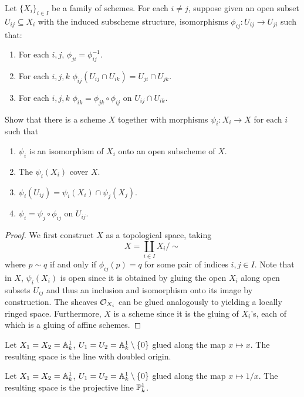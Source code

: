 \begin{proposition}\label{prop: gluing schemes}
    Let $\{X_{i}\}_{i\in I}$ be a family of schemes. For each $i\neq j$, suppose given an open subset $U_{ij}\subseteq X_{i}$ with the induced subscheme structure, isomorphisms $\phi_{ij}:U_{ij}\to U_{ji}$ such that:
    \begin{enumerate}[label=(\arabic*)]
        \item For each $i,j$, $\phi_{ji}=\phi_{ij}^{-1}$. 
        \item For each $i,j,k$ $\phi_{ij}(U_{ij}\cap U_{ik})=U_{ji}\cap U_{jk}$. 
        \item For each $i,j,k$ $\phi_{ik}=\phi_{jk}\circ\phi_{ij}$ on $U_{ij}\cap U_{ik}$. 
    \end{enumerate}
    Show that there is a scheme $X$ together with morphisms $\psi_{i}:X_{i}\to X$ for each $i$ such that 
    \begin{enumerate}[label=(\arabic*)]
        \item $\psi_{i}$ is an isomorphism of $X_{i}$ onto an open subscheme of $X$. 
        \item The $\psi_{i}(X_{i})$ cover $X$. 
        \item $\psi_{i}(U_{ij})=\psi_{i}(X_{i})\cap \psi_{j}(X_{j})$. 
        \item $\psi_{i}=\psi_{j}\circ\phi_{ij}$ on $U_{ij}$. 
    \end{enumerate}
\end{proposition}
\begin{proof}
    We first construct $X$ as a topological space, taking 
    $$X=\coprod_{i\in I}X_{i}/\sim$$
    where $p\sim q$ if and only if $\phi_{ij}(p)=q$ for some pair of indices $i,j\in I$. Note that in $X$, $\psi_{i}(X_{i})$ is open since it is obtained by gluing the open $X_{i}$ along open subsets $U_{ij}$ and thus an inclusion and isomorphism onto its image by construction. The sheaves $\mathcal{O}_{X_{i}}$ can be glued analogously to  yielding a locally ringed space. Furthermore, $X$ is a scheme since it is the gluing of $X_{i}$'s, each of which is a gluing of affine schemes. 
\end{proof}
\begin{example}\label{ex: doubled origin}
    Let $X_{1}=X_{2}=\mathbb{A}^{1}_{k}$, $U_{1}=U_{2}=\mathbb{A}^{1}_{k}\setminus\{0\}$ glued along the map $x\mapsto x$. The resulting space is the line with doubled origin. 
\end{example}
\begin{example}\label{ex: projective line}
    Let $X_{1}=X_{2}=\mathbb{A}^{1}_{k}$, $U_{1}=U_{2}=\mathbb{A}^{1}_{k}\setminus\{0\}$ glued along the map $x\mapsto 1/x$. The resulting space is the projective line $\mathbb{P}^{1}_{k}$.  
\end{example}
